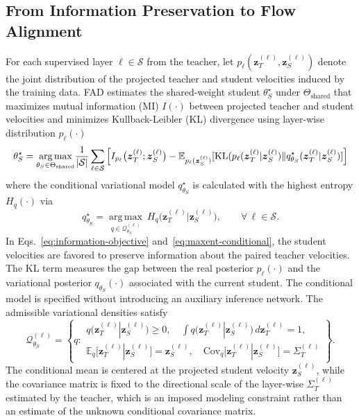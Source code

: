 \documentclass{article}
\newcommand{\E}{\mathbb{E}}
\newcommand{\calS}{\mathcal{S}}
\newcommand{\calQ}{\mathcal{Q}}
\newcommand{\KL}{\mathrm{KL}}
\newcommand{\Cov}{\mathrm{Cov}}
\newcommand{\bz}{\boldsymbol{z}}
\newcommand{\bSigma}{\varSigma}
\theoremstyle{plain}
\theoremstyle{definition}
\theoremstyle{remark}
\begin{document}
\subsection{From Information Preservation to Flow Alignment}
\label{sec:derivation}

For each supervised layer $\ell\in\calS$ from the teacher, let $p_\ell(\bz_T^{(\ell)},\bz_S^{(\ell)})$ denote the joint distribution of the projected teacher and student velocities induced by the training data. FAD estimates the shared-weight student $\theta_S^\star$ under $\Theta_{\mathrm{shared}}$ that maximizes mutual information (MI) $I(\cdot)$ between projected teacher and student velocities and minimizes Kullback-Leibler (KL) divergence using layer-wise distribution ${p_\ell}(\cdot)$
\begin{equation}
\resizebox{\linewidth}{!}{$\displaystyle \theta_S^\star = \underset{\theta_S\in\Theta_{\mathrm{shared}}} {\operatorname{arg\,max}}
\frac{1}{|\calS|} \sum_{\ell\in\calS} \left[I_{p_\ell} \bigl(\bz_T^{(\ell)}; \bz_S^{(\ell)}
\bigr) - \E_{p_\ell(\bz_S^{(\ell)})} [ \KL( p_\ell (\bz_T^{(\ell)} | \bz_S^{(\ell)} ) \Vert q_{\theta_S}^{\star}
  (\bz_T^{(\ell)} | \bz_S^{(\ell)} ) ] \right]$}
\label{eq:information-objective}
\end{equation}
where the conditional variational model $q_{\theta_S}^{\star}$ is calculated with the highest entropy $H_q(\cdot)$ via
\begin{equation}
q_{\theta_S}^{\star} = \underset{q\in\calQ_{\theta_S}^{(\ell)}} {\operatorname{arg\,max}} ~H_q \bigl(\bz_T^{(\ell)} | \bz_S^{(\ell)} \bigr), \qquad \forall\,\ell\in\calS.
\label{eq:maxent-conditional}
\end{equation}
In Eqs.~\eqref{eq:information-objective} and~\eqref{eq:maxent-conditional}, the student velocities are favored to preserve information about the paired teacher velocities. The KL term measures the gap between the real posterior $p_\ell(\cdot)$ and the variational posterior $q_{\theta_S}(\cdot)$ associated with the current student. The conditional model is specified without introducing an auxiliary inference network. The admissible variational densities satisfy
\begin{equation}
\calQ_{\theta_S}^{(\ell)} = \left\{q: \begin{array}{l}
q\bigl(\bz_T^{(\ell)}|\bz_S^{(\ell)}\bigr)\geq 0, \quad
\displaystyle \int q\bigl(\bz_T^{(\ell)}|\bz_S^{(\ell)}\bigr)
\,d\bz_T^{(\ell)} = 1, \\[2mm]
\displaystyle \E_q \bigl[\bz_T^{(\ell)} | \bz_S^{(\ell)} \bigr]
= \bz_S^{(\ell)}, \quad \displaystyle \Cov_q \bigl[ \bz_T^{(\ell)}
 | \bz_S^{(\ell)} \bigr] = \bSigma_T^{(\ell)} \end{array} \right\}.
\label{eq:conditional-set}
\end{equation}
The conditional mean is centered at the projected student velocity $\bz_S^{(\ell)}$, while the covariance matrix is fixed to the directional scale of the layer-wise $\bSigma_T^{(\ell)}$ estimated by the teacher, which is an imposed modeling constraint rather than an estimate of the unknown conditional covariance matrix.
\end{document}
